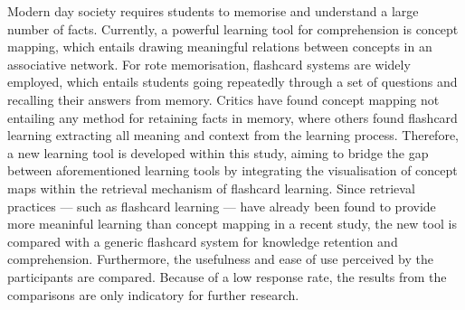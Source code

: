 Modern day society requires students to memorise and understand a large number of facts. Currently, a powerful learning tool for comprehension is concept mapping, which entails drawing meaningful relations between concepts in an associative network. For rote memorisation, flashcard systems are widely employed, which entails students going repeatedly through a set of questions and recalling their answers from memory. Critics have found concept mapping not entailing any method for retaining facts in memory, where others found flashcard learning extracting all meaning and context from the learning process. Therefore, a new learning tool is developed within this study, aiming to bridge the gap between aforementioned learning tools by integrating the visualisation of concept maps within the retrieval mechanism of flashcard learning. Since retrieval practices --- such as flashcard learning --- have already been found to provide more meaninful learning than concept mapping in a recent study, the new tool is compared with a generic flashcard system for knowledge retention and comprehension. Furthermore, the usefulness and ease of use perceived by the participants are compared. Because of a low response rate, the results from the comparisons are only indicatory for further research.
